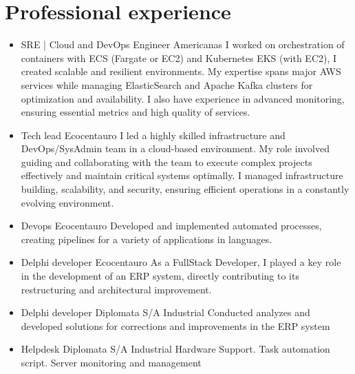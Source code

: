 \section{Professional experience}
\vspace{6pt}
\begin{itemize}

\item
{
{}
{SRE | Cloud and DevOps Engineer}
{Americanas}
{}
{
I worked on orchestration of containers with ECS (Fargate or EC2) and Kubernetes EKS (with EC2), I created scalable and resilient environments.
My expertise spans major AWS services while managing ElasticSearch and Apache Kafka clusters for optimization and availability.    
I also have experience in advanced monitoring, ensuring essential metrics and high quality of services.}
}

\vspace{6pt}
\item
{
{}
{Tech lead}
{Ecocentauro}
{}
{
I led a highly skilled infrastructure and DevOps/SysAdmin team in a cloud-based environment. 
My role involved guiding and collaborating with the team to execute complex projects effectively and maintain critical systems optimally. 
I managed infrastructure building, scalability, and security, ensuring efficient operations in a constantly evolving environment.}
}

\vspace{6pt}
\item
{
{}
{Devops}
{Ecocentauro}
{}
{Developed and implemented automated processes, creating pipelines for a variety of applications in languages.}
}

\newpage

\vspace{6pt}
\item
{
{}
{Delphi developer}
{Ecocentauro}
{}
{As a FullStack Developer, I played a key role in the development of an ERP system, directly contributing to its restructuring and architectural improvement.}
}

\vspace{6pt}
\item
{
{}
{Delphi developer}
{Diplomata S/A Industrial}
{}
{Conducted analyzes and developed solutions for corrections and improvements in the ERP system}
}

\vspace{6pt}
\item
{
{}
{Helpdesk}
{Diplomata S/A Industrial}
{}
{Hardware Support. Task automation script. Server monitoring and management}
}

\end{itemize}